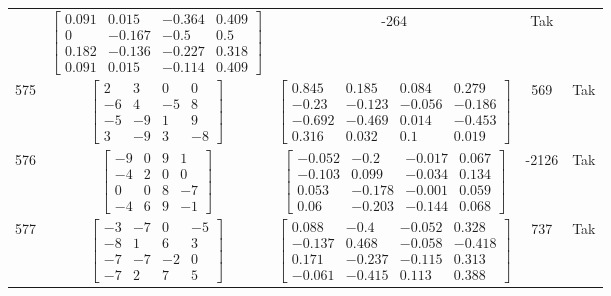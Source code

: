 \documentclass[a4paper,12pt]{article}
\begin{document}
\begin{tabular}{c c c c c}
&
$\begin{bmatrix} 0.091 & 0.015 & -0.364 & 0.409 \\ 0 & -0.167 & -0.5 & 0.5 \\ 0.182 & -0.136 & -0.227 & 0.318 \\ 0.091 & 0.015 & -0.114 & 0.409 \end{bmatrix}$
&
-264
&
Tak
\\
575
&
$\begin{bmatrix} 2 & 3 & 0 & 0 \\ -6 & 4 & -5 & 8 \\ -5 & -9 & 1 & 9 \\ 3 & -9 & 3 & -8 \end{bmatrix}$
&
$\begin{bmatrix} 0.845 & 0.185 & 0.084 & 0.279 \\ -0.23 & -0.123 & -0.056 & -0.186 \\ -0.692 & -0.469 & 0.014 & -0.453 \\ 0.316 & 0.032 & 0.1 & 0.019 \end{bmatrix}$
&
569
&
Tak
\\
576
&
$\begin{bmatrix} -9 & 0 & 9 & 1 \\ -4 & 2 & 0 & 0 \\ 0 & 0 & 8 & -7 \\ -4 & 6 & 9 & -1 \end{bmatrix}$
&
$\begin{bmatrix} -0.052 & -0.2 & -0.017 & 0.067 \\ -0.103 & 0.099 & -0.034 & 0.134 \\ 0.053 & -0.178 & -0.001 & 0.059 \\ 0.06 & -0.203 & -0.144 & 0.068 \end{bmatrix}$
&
-2126
&
Tak
\\
577
&
$\begin{bmatrix} -3 & -7 & 0 & -5 \\ -8 & 1 & 6 & 3 \\ -7 & -7 & -2 & 0 \\ -7 & 2 & 7 & 5 \end{bmatrix}$
&
$\begin{bmatrix} 0.088 & -0.4 & -0.052 & 0.328 \\ -0.137 & 0.468 & -0.058 & -0.418 \\ 0.171 & -0.237 & -0.115 & 0.313 \\ -0.061 & -0.415 & 0.113 & 0.388 \end{bmatrix}$
&
737
&
Tak
\\

\end{tabular}
\end{document}
